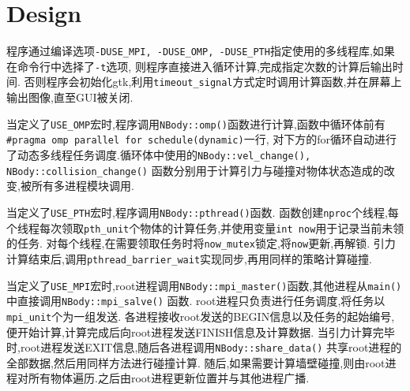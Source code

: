 \section{Design}
	程序通过编译选项\verb|-DUSE_MPI, -DUSE_OMP, -DUSE_PTH|指定使用的多线程库,如果在命令行中选择了\verb|-t|选项,
	则程序直接进入循环计算,完成指定次数的计算后输出时间.
	否则程序会初始化gtk,利用\verb|timeout_signal|方式定时调用计算函数,并在屏幕上输出图像,直至GUI被关闭.

	当定义了\verb|USE_OMP|宏时,程序调用\verb|NBody::omp()|函数进行计算,函数中循环体前有\verb|#pragma omp parallel for schedule(dynamic)|一行,
	对下方的for循环自动进行了动态多线程任务调度.循环体中使用的\verb|NBody::vel_change(), NBody::collision_change()|
	函数分别用于计算引力与碰撞对物体状态造成的改变,被所有多进程模块调用.
	
	当定义了\verb|USE_PTH|宏时,程序调用\verb|NBody::pthread()|函数.
	函数创建\verb|nproc|个线程,每个线程每次领取\verb|pth_unit|个物体的计算任务,并使用变量\verb|int now|用于记录当前未领的任务.
	对每个线程,在需要领取任务时将\verb|now_mutex|锁定,将\verb|now|更新,再解锁.
	引力计算结束后,调用\verb|pthread_barrier_wait|实现同步,再用同样的策略计算碰撞.
	
	当定义了\verb|USE_MPI|宏时,root进程调用\verb|NBody::mpi_master()|函数,其他进程从\verb|main()|中直接调用\verb|NBody::mpi_salve()|
	函数.
	root进程只负责进行任务调度,将任务以\verb|mpi_unit|个为一组发送.
	各进程接收root发送的BEGIN信息以及任务的起始编号,便开始计算,计算完成后向root进程发送FINISH信息及计算数据.
	当引力计算完毕时,root进程发送EXIT信息,随后各进程调用\verb|NBody::share_data()|
	共享root进程的全部数据,然后用同样方法进行碰撞计算.
	随后,如果需要计算墙壁碰撞,则由root进程对所有物体遍历.之后由root进程更新位置并与其他进程广播.



